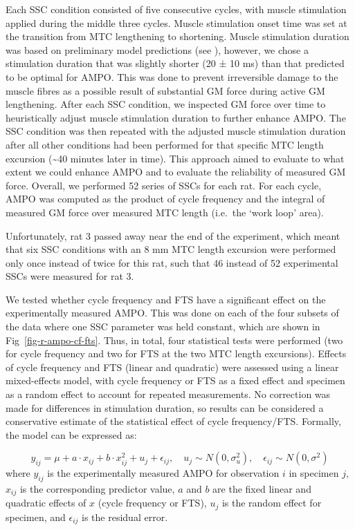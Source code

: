 \documentclass[
  10pt,
  letterpaper,
]{article}
\begin{document}
Each SSC condition consisted of five consecutive cycles, with muscle
stimulation applied during the middle three cycles. Muscle stimulation
onset time was set at the transition from MTC lengthening to shortening.
Muscle stimulation duration was based on preliminary model predictions
(see {}), however, we chose a stimulation duration that
was slightly shorter (20 ± 10 ms) than that predicted to be optimal for
AMPO. This was done to prevent irreversible damage to the muscle fibres
as a possible result of substantial GM force during active GM
lengthening. After each SSC condition, we inspected GM force over time
to heuristically adjust muscle stimulation duration to further enhance
AMPO. The SSC condition was then repeated with the adjusted muscle
stimulation duration after all other conditions had been performed for
that specific MTC length excursion (\textasciitilde40 minutes later in
time). This approach aimed to evaluate to what extent we could enhance
AMPO and to evaluate the reliability of measured GM force. Overall, we
performed 52 series of SSCs for each rat. For each cycle, AMPO was
computed as the product of cycle frequency and the integral of measured
GM force over measured MTC length (i.e.~the `work loop' area).

Unfortunately, rat 3 passed away near the end of the experiment, which
meant that six SSC conditions with an 8 mm MTC length excursion were
performed only once instead of twice for this rat, such that 46 instead
of 52 experimental SSCs were measured for rat 3.

We tested whether cycle frequency and FTS have a significant effect on
the experimentally measured AMPO. This was done on each of the four
subsets of the data where one SSC parameter was held constant, which are
shown in Fig~\ref{fig-r-ampo-cf-fts}. Thus, in total, four statistical
tests were performed (two for cycle frequency and two for FTS at the two
MTC length excursions). Effects of cycle frequency and FTS (linear and
quadratic) were assessed using a linear mixed-effects model, with cycle
frequency or FTS as a fixed effect and specimen as a random effect to
account for repeated measurements. No correction was made for
differences in stimulation duration, so results can be considered a
conservative estimate of the statistical effect of cycle frequency/FTS.
Formally, the model can be expressed as:

\[
y_{ij} = \mu + a \cdot x_{ij} + b \cdot x_{ij}^2 + u_j + \epsilon_{ij}, \quad
u_j \sim N(0, \sigma_u^2), \quad \epsilon_{ij} \sim N(0, \sigma^2)
\] where \(y_{ij}\) is the experimentally measured AMPO for observation
\(i\) in specimen \(j\), \(x_{ij}\) is the corresponding predictor
value, \(a\) and \(b\) are the fixed linear and quadratic effects of
\(x\) (cycle frequency or FTS), \(u_j\) is the random effect for
specimen, and \(\epsilon_{ij}\) is the residual error.
\end{document}
